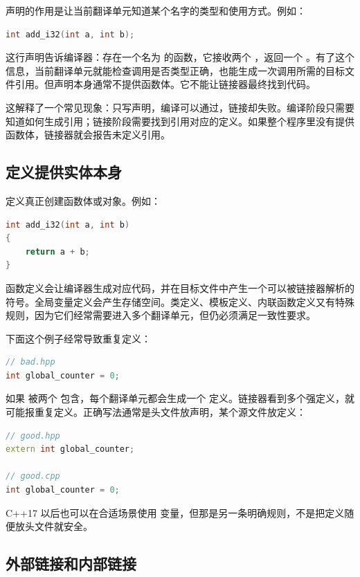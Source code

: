 声明的作用是让当前翻译单元知道某个名字的类型和使用方式。例如：

\begin{lstlisting}[language=C++]
int add_i32(int a, int b);
\end{lstlisting}

这行声明告诉编译器：存在一个名为  的函数，它接收两个 ，返回一个 。有了这个信息，当前翻译单元就能检查调用是否类型正确，也能生成一次调用所需的目标文件引用。但声明本身通常不提供函数体。它不能让链接器最终找到代码。

这解释了一个常见现象：只写声明，编译可以通过，链接却失败。编译阶段只需要知道如何生成引用；链接阶段需要找到引用对应的定义。如果整个程序里没有提供函数体，链接器就会报告未定义引用。

\subsection{定义提供实体本身}

定义真正创建函数体或对象。例如：

\begin{lstlisting}[language=C++]
int add_i32(int a, int b)
{
    return a + b;
}
\end{lstlisting}

函数定义会让编译器生成对应代码，并在目标文件中产生一个可以被链接器解析的符号。全局变量定义会产生存储空间。类定义、模板定义、内联函数定义又有特殊规则，因为它们经常需要进入多个翻译单元，但仍必须满足一致性要求。

下面这个例子经常导致重复定义：

\begin{lstlisting}[language=C++]
// bad.hpp
int global_counter = 0;
\end{lstlisting}

如果  被两个  包含，每个翻译单元都会生成一个  定义。链接器看到多个强定义，就可能报重复定义。正确写法通常是头文件放声明，某个源文件放定义：

\begin{lstlisting}[language=C++]
// good.hpp
extern int global_counter;

// good.cpp
int global_counter = 0;
\end{lstlisting}

C++17 以后也可以在合适场景使用  变量，但那是另一条明确规则，不是把定义随便放头文件就安全。

\subsection{外部链接和内部链接}

